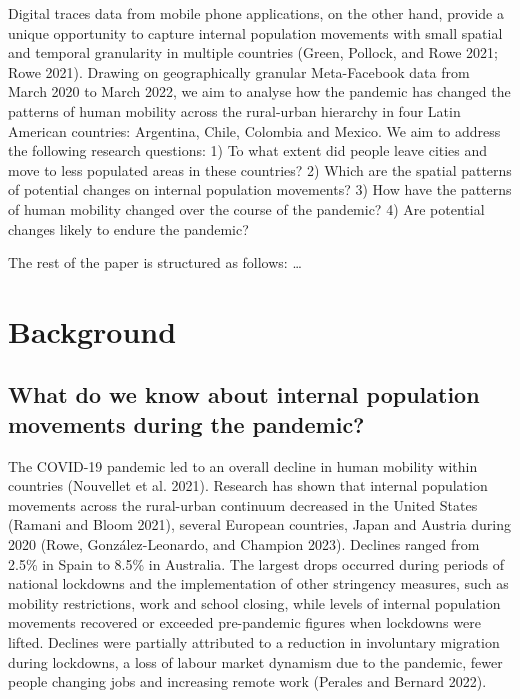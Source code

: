 \documentclass[11pt,letterpaper]{article}
\begin{document}
Digital traces data from mobile phone applications, on the other hand,
provide a unique opportunity to capture internal population movements
with small spatial and temporal granularity in multiple countries
(Green, Pollock, and Rowe 2021; Rowe 2021). Drawing on geographically
granular Meta-Facebook data from March 2020 to March 2022, we aim to
analyse how the pandemic has changed the patterns of human mobility
across the rural-urban hierarchy in four Latin American countries:
Argentina, Chile, Colombia and Mexico. We aim to address the following
research questions: 1) To what extent did people leave cities and move
to less populated areas in these countries? 2) Which are the spatial
patterns of potential changes on internal population movements? 3) How
have the patterns of human mobility changed over the course of the
pandemic? 4) Are potential changes likely to endure the pandemic?

The rest of the paper is structured as follows: \ldots{}

\section{Background}

\subsection{What do we know about internal population movements during the pandemic?}

The COVID-19 pandemic led to an overall decline in human mobility within
countries (Nouvellet et al. 2021). Research has shown that internal
population movements across the rural-urban continuum decreased in the
United States (Ramani and Bloom 2021), several European countries, Japan
and Austria during 2020 (Rowe, González-Leonardo, and Champion 2023).
Declines ranged from 2.5\% in Spain to 8.5\% in Australia. The largest
drops occurred during periods of national lockdowns and the
implementation of other stringency measures, such as mobility
restrictions, work and school closing, while levels of internal
population movements recovered or exceeded pre-pandemic figures when
lockdowns were lifted. Declines were partially attributed to a reduction
in involuntary migration during lockdowns, a loss of labour market
dynamism due to the pandemic, fewer people changing jobs and increasing
remote work (Perales and Bernard 2022).
\end{document}

